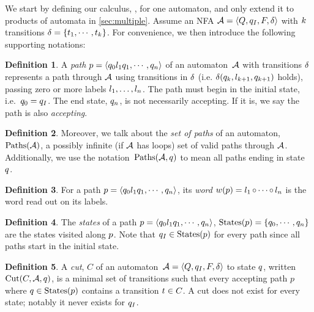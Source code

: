 \documentclass[acmsmall,review,anonymous,screen]{acmart}\settopmatter{printfolios=true,printccs=true,printacmref=true}
\theoremstyle{definition}
\newtheorem{definition}{Definition}[section]
\begin{document}
We start by defining our calculus, \Calculus{}, for one automaton, and only
extend it to products of automata in \cref{sec:multiple}. Assume an NFA
$\mathcal{A} = \left\langle Q, q_I, F, \delta\right\rangle$ with $k$ transitions $\delta =
\left\{t_{1} , \cdots , t_{k}\right\}$. For convenience, we then
introduce the following supporting notations:

\begin{definition}
  A \textit{path} $p = \left\langle q_0 l_1 q_1 , \cdots , q_n\right\rangle$ of an automaton~$\mathcal{A}$ with
  transitions $\delta$ represents a path through $\mathcal{A}$ using
  transitions in $\delta$ (i.e. $\delta(q_k, l_{k+1},
  q_{k+1})$ holds), passing zero or more labels $l_1, \ldots,
  l_n$. The path must begin in the initial state, i.e.~$q_0 =
  q_I$. The end state, $q_n$, is not necessarily accepting. If it
  is, we say the path is also \textit{accepting}.
  \end{definition}

\begin{definition}
  Moreover, we talk about the \textit{set of paths} of an automaton,
  $\operatorname{Paths}(\mathcal{A})$, a possibly infinite (if $\mathcal{A}$ has loops) set of
  valid paths through $\mathcal{A}$. Additionally, we use the
  notation~$\operatorname{Paths}(\mathcal{A}, q)$ to mean all paths ending in
  state~$q$.
\end{definition}

\begin{definition}
  For a path $p = \left\langle q_0 l_1 q_1 , \cdots ,
  q_n\right\rangle$, its \textit{word} $w(p) = l_1 \operatorname{\circ} \cdots \operatorname{\circ}
  l_n$ is the word read out on its labels.
\end{definition}

\begin{definition}
  The \textit{states} of a path $p = \left\langle q_0 l_1 q_1
  , \cdots , q_n\right\rangle$, $\operatorname{States}(p) = \left\{q_0, \cdots ,
  q_n\right\}$ are the states visited along $p$. Note that $q_I \in
  \operatorname{States}(p)$ for every path since all paths start in the initial state.
\end{definition}

\begin{definition}
  A \textit{cut}, $C$ of an automaton~$\mathcal{A} = \left\langle Q, q_I, F, \delta\right\rangle$ to state
  $q$, written $\operatorname{Cut}(C, \mathcal{A}, q)$, is a minimal set of
  transitions such that every accepting path $p$ where $q \in
  \operatorname{States}(p)$ contains a transition $t \in C$. A cut does not
  exist for every state; notably it never exists for $q_I$.
\end{definition}
\end{document}
